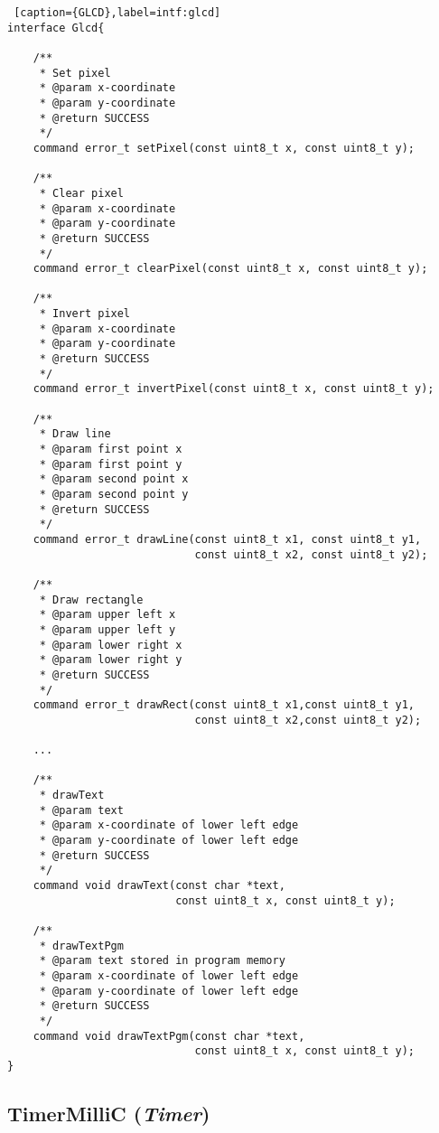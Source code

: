 \documentclass[a4paper,10pt]{article}
\def\interface#1{{\em #1\/}}
\begin{document}
\begin{lstlisting} [caption={GLCD},label=intf:glcd]
interface Glcd{

    /**
     * Set pixel
     * @param x-coordinate
     * @param y-coordinate
     * @return SUCCESS
     */
    command error_t setPixel(const uint8_t x, const uint8_t y);

    /**
     * Clear pixel
     * @param x-coordinate
     * @param y-coordinate
     * @return SUCCESS
     */
    command error_t clearPixel(const uint8_t x, const uint8_t y);

    /**
     * Invert pixel
     * @param x-coordinate
     * @param y-coordinate
     * @return SUCCESS
     */
    command error_t invertPixel(const uint8_t x, const uint8_t y);

    /**
     * Draw line
     * @param first point x
     * @param first point y
     * @param second point x
     * @param second point y
     * @return SUCCESS
     */
    command error_t drawLine(const uint8_t x1, const uint8_t y1,
                             const uint8_t x2, const uint8_t y2);

    /**
     * Draw rectangle
     * @param upper left x
     * @param upper left y
     * @param lower right x
     * @param lower right y
     * @return SUCCESS
     */
    command error_t drawRect(const uint8_t x1,const uint8_t y1,
                             const uint8_t x2,const uint8_t y2);

    ...

    /**
     * drawText
     * @param text
     * @param x-coordinate of lower left edge
     * @param y-coordinate of lower left edge
     * @return SUCCESS
     */
    command void drawText(const char *text,
                          const uint8_t x, const uint8_t y);

    /**
     * drawTextPgm
     * @param text stored in program memory
     * @param x-coordinate of lower left edge
     * @param y-coordinate of lower left edge
     * @return SUCCESS
     */
    command void drawTextPgm(const char *text,
                             const uint8_t x, const uint8_t y);
}
\end{lstlisting}

\subsection{TimerMilliC (\interface{Timer})}
\end{document}
